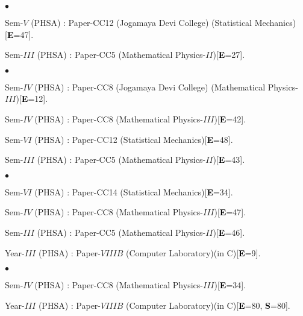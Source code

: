 \documentclass[margin,line]{res}
\newenvironment{list1}{
  \begin{list}{\ding{113}}{%
      \setlength{\itemsep}{0in}
      \setlength{\parsep}{0in} \setlength{\parskip}{0in}
      \setlength{\topsep}{0in} \setlength{\partopsep}{0in} 
      \setlength{\leftmargin}{0.17in}}}{\end{list}}
\newenvironment{list2}{
  \begin{list}{$\bullet$}{%
      \setlength{\itemsep}{0in}
      \setlength{\parsep}{0in} \setlength{\parskip}{0in}
      \setlength{\topsep}{0in} \setlength{\partopsep}{0in} 
      \setlength{\leftmargin}{0.2in}}}{\end{list}}
\begin{document}
\begin{resume}
\begin{list2}
\item Sem-$V$ (PHSA) : Paper-CC12 (Jogamaya Devi College) (Statistical Mechanics)[\textcolor{black}{\bf E}=47]. 
\item Sem-$III$ (PHSA) : Paper-CC$5$ (Mathematical Physics-$II$)[\textcolor{black}{\bf E}=27].
\end{list2}
\begin{list1}
\item[] \textcolor{iris}{}
\vspace{1mm}
\end{list1}
\begin{list2}
\item Sem-$IV$ (PHSA) : Paper-CC8 (Jogamaya Devi College) (Mathematical Physics-$III$)[\textcolor{black}{\bf E}=12]. 
\item Sem-$IV$ (PHSA) : Paper-CC8 (Mathematical Physics-$III$)[\textcolor{black}{\bf E}=42]. 
\item Sem-$VI$ (PHSA) : Paper-CC12 (Statistical Mechanics)[\textcolor{black}{\bf E}=48]. 
\item Sem-$III$ (PHSA) : Paper-CC$5$ (Mathematical Physics-$II$)[\textcolor{black}{\bf E}=43].
\end{list2}
\begin{list1}
\item[] \textcolor{iris}{}
\vspace{1mm}
\end{list1}
\begin{list2}
\item Sem-$VI$ (PHSA) : Paper-CC14 (Statistical Mechanics)[\textcolor{black}{\bf E}=34]. 
\item Sem-$IV$ (PHSA) : Paper-CC8 (Mathematical Physics-$III$)[\textcolor{black}{\bf E}=47]. 
\item Sem-$III$ (PHSA) : Paper-CC$5$ (Mathematical Physics-$II$)[\textcolor{black}{\bf E}=46]. 
\item Year-$III$ (PHSA) : Paper-$VIIIB$ (Computer Laboratory)(in C)[\textcolor{black}{\bf E}=9].
\end{list2}
\begin{list1}
\item[] \textcolor{iris}{}
\vspace{1mm}
\end{list1}
\begin{list2}
\item Sem-$IV$ (PHSA) : Paper-CC8 (Mathematical Physics-$III$)[\textcolor{black}{\bf E}=34]. 
\item Year-$III$ (PHSA) : Paper-$VIIIB$ (Computer Laboratory)(in C)[\textcolor{black}{\bf E}=80, \textcolor{black}{\bf S}=80]. 

\end{list2}
\end{resume}
\end{document}
